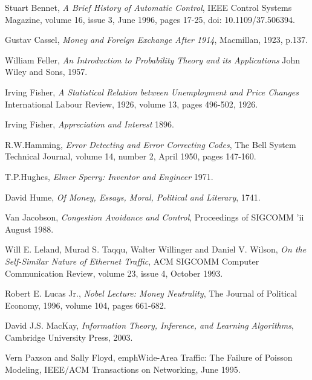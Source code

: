 \begin{thebibliography}{9}

    Stuart Bennet,
    \emph{A Brief History of Automatic Control},
    IEEE Control Systems Magazine,
    volume 16,
    issue 3,
    June 1996,
    pages 17-25,
    doi: 10.1109/37.506394.

    Gustav Cassel,
    \emph{Money and Foreign Exchange After 1914},
    Macmillan,
    1923,
    p.137.

    William Feller,
    \emph{An Introduction to Probability Theory and its Applications}
    John Wiley and Sons,
    1957.

    Irving Fisher, 
    \emph{A Statistical Relation between Unemployment and Price Changes}
    International Labour Review,
    1926,
    volume 13,
    pages 496-502,
    1926.

    Irving Fisher,
    \emph{Appreciation and Interest}
    1896.

    R.W.Hamming,
    \emph{Error Detecting and Error Correcting Codes},
    The Bell System Technical Journal,
    volume 14,
    number 2,
    April 1950,
    pages 147-160.

    T.P.Hughes,
    \emph{Elmer Sperry: Inventor and Engineer}
    1971.

    David Hume,
    \emph{Of Money, Essays, Moral, Political and Literary},
    1741.

    Van Jacobson,
    \emph{Congestion Avoidance and Control},
    Proceedings of SIGCOMM 'ii
    August 1988.

    Will E. Leland, Murad S. Taqqu, Walter Willinger and Daniel V. Wilson,
    \emph{On the Self-Similar Nature of Ethernet Traffic},
    ACM SIGCOMM Computer Communication Review,
    volume 23,
    issue 4,
    October 1993.

    Robert E. Lucas Jr.,
    \emph{Nobel Lecture: Money Neutrality},
    The Journal of Political Economy,
    1996,
    volume 104,
    pages 661-682.


    David J.S. MacKay,
    \emph{Information Theory, Inference, and Learning Algorithms},
    Cambridge University Press,
    2003.

    Vern Paxson and Sally Floyd,
    emph{Wide-Area Traffic: The Failure of Poisson Modeling},
    IEEE/ACM Transactions on Networking,
    June 1995.


\end{thebibliography}
